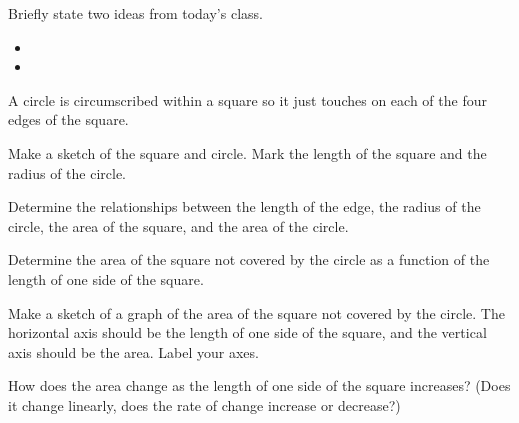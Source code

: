 \begin{problem}
\item Briefly state two ideas from today's class.
  \begin{itemize}
  \item 
  \item 
  \end{itemize}
\item A circle is circumscribed within a square so it just touches on
  each of the four edges of the square.
  \begin{subproblem}
    \item Make a sketch of the square and circle. Mark the length of
      the square and the radius of the circle.
    \item Determine the relationships between the length of the edge,
      the radius of the circle, the area of the square, and the area
      of the circle.
    \item Determine the area of the square not covered by the circle
      as a function of the length of one side of the square.
    \item Make a sketch of a graph of the area of the square not
      covered by the circle. The horizontal axis should be the length
      of one side of the square, and the vertical axis should be the
      area. Label your axes.
    \item How does the area change as the length of one side of the
      square increases? (Does it change linearly, does the rate of
      change increase or decrease?)
  \end{subproblem}
\end{problem}



